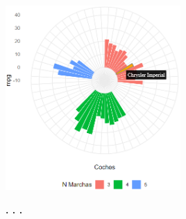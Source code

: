 \documentclass{article}\usepackage[]{graphicx}\usepackage[]{color}
\begin{document}
\vbox{
    \centering
    \includegraphics[width=0.5\textwidth]{imag/ggplot2_inte_cr}
}
\begin{center}
\textbf{. . .}
\end{center}
\end{document}
